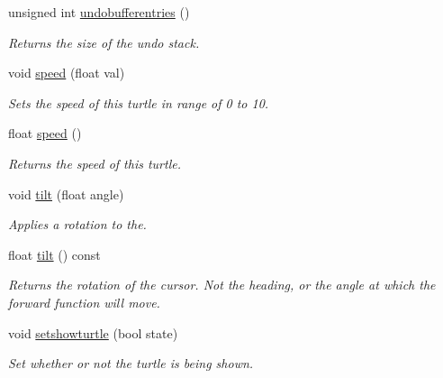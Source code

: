 \begin{DoxyCompactItemize}
\mbox{\label{classcturtle_1_1Turtle_ae7fd2fb0ac04dea930d6411f87229dfa}} 
unsigned int \hyperlink{classcturtle_1_1Turtle_ae7fd2fb0ac04dea930d6411f87229dfa}{undobufferentries} ()
\begin{DoxyCompactList}\small\item\em Returns the size of the undo stack. \end{DoxyCompactList}\item 
void \hyperlink{classcturtle_1_1Turtle_a5f2010373aeb82207975e9f1b4168747}{speed} (float val)
\begin{DoxyCompactList}\small\item\em Sets the speed of this turtle in range of 0 to 10. \end{DoxyCompactList}\item 
\mbox{\label{classcturtle_1_1Turtle_af018ea1fa9eb9be80fdf53fabcb668eb}} 
float \hyperlink{classcturtle_1_1Turtle_af018ea1fa9eb9be80fdf53fabcb668eb}{speed} ()
\begin{DoxyCompactList}\small\item\em Returns the speed of this turtle. \end{DoxyCompactList}\item 
\mbox{\label{classcturtle_1_1Turtle_ae3e48f309eaea7b4426ad1a173f15ef5}} 
void \hyperlink{classcturtle_1_1Turtle_ae3e48f309eaea7b4426ad1a173f15ef5}{tilt} (float angle)
\begin{DoxyCompactList}\small\item\em Applies a rotation to the. \end{DoxyCompactList}\item 
\mbox{\label{classcturtle_1_1Turtle_aec48e043d9f3a259d7500d94323d6890}} 
float \hyperlink{classcturtle_1_1Turtle_aec48e043d9f3a259d7500d94323d6890}{tilt} () const
\begin{DoxyCompactList}\small\item\em Returns the rotation of the cursor. Not the heading, or the angle at which the forward function will move. \end{DoxyCompactList}\item 
void \hyperlink{classcturtle_1_1Turtle_a9e83fdd5c469e4863cf9b460e4d29130}{setshowturtle} (bool state)
\begin{DoxyCompactList}\small\item\em Set whether or not the turtle is being shown. \end{DoxyCompactList}\item 

\end{DoxyCompactItemize}
